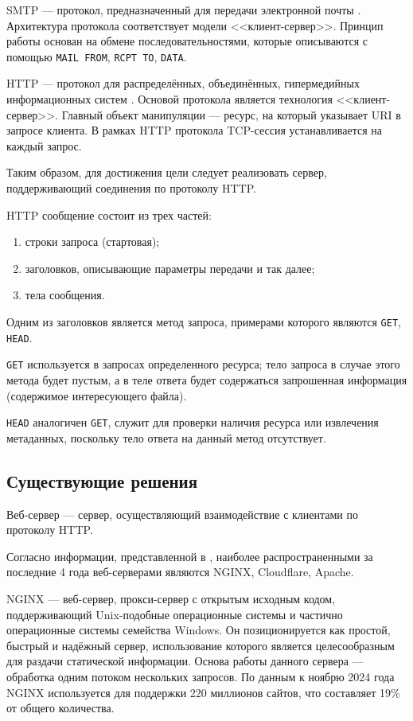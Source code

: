 SMTP --- протокол, предназначенный для передачи электронной почты \cite{johnson2000internet}.
Архитектура протокола соответствует модели <<клиент-сервер>>.
Принцип работы основан на обмене последовательностями, которые описываются с помощью \texttt{MAIL FROM}, \texttt{RCPT TO}, \texttt{DATA}.

HTTP --- протокол для распределённых, объединённых, гипермедийных информационных систем \cite{rfc9112}.
Основой протокола является технология <<клиент-сервер>>.
Главный объект манипуляции --- ресурс, на который указывает URI в запросе клиента.
В рамках HTTP протокола TCP-сессия устанавливается на каждый запрос.

Таким образом, для достижения цели следует реализовать сервер, поддерживающий соединения по протоколу HTTP.

HTTP сообщение состоит из трех частей:
\begin{enumerate}
	\item строки запроса (стартовая);
	\item заголовков, описывающие параметры передачи и так далее;
	\item тела сообщения.
\end{enumerate}
Одним из заголовков является метод запроса, примерами которого являются \texttt{GET}, \texttt{HEAD}.

\texttt{GET} используется в запросах определенного ресурса; тело запроса в случае этого метода будет пустым, а в теле ответа будет содержаться запрошенная информация (содержимое интересующего файла).

\texttt{HEAD} аналогичен \texttt{GET}, служит для проверки наличия ресурса или извлечения метаданных, поскольку тело ответа на данный метод отсутствует.

\subsection{Существующие решения}

Веб-сервер --- сервер, осуществляющий взаимодействие с клиентами по протоколу HTTP.

Согласно информации, представленной в \cite{netcraft2024stat}, наиболее распространенными за последние 4 года веб-серверами являются NGINX, Cloudflare, Apache.

NGINX \cite{nginx} --- веб-сервер, прокси-сервер с открытым исходным кодом, поддерживающий Unix-подобные операционные системы и частично операционные системы семейства Windows.
Он позиционируется как простой, быстрый и надёжный сервер, использование которого является целесообразным для раздачи статической информации.
Основа работы данного сервера --- обработка одним потоком нескольких запросов.
По данным \cite{netcraft2024stat} к ноябрю 2024 года NGINX используется для поддержки 220 миллионов сайтов, что составляет 19\% от общего количества.

